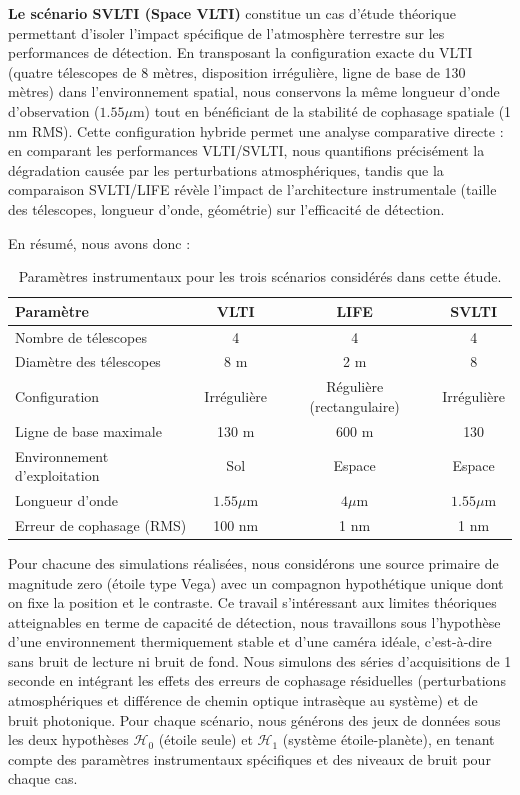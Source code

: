 \documentclass{article}
\begin{document}
\textbf{Le scénario SVLTI (Space VLTI)} constitue un cas d'étude théorique permettant d'isoler l'impact spécifique de l'atmosphère terrestre sur les performances de détection. En transposant la configuration exacte du VLTI (quatre télescopes de 8 mètres, disposition irrégulière, ligne de base de 130 mètres) dans l'environnement spatial, nous conservons la même longueur d'onde d'observation ($1.55\mu$m) tout en bénéficiant de la stabilité de cophasage spatiale (1 nm RMS). Cette configuration hybride permet une analyse comparative directe : en comparant les performances VLTI/SVLTI, nous quantifions précisément la dégradation causée par les perturbations atmosphériques, tandis que la comparaison SVLTI/LIFE révèle l'impact de l'architecture instrumentale (taille des télescopes, longueur d'onde, géométrie) sur l'efficacité de détection.

En résumé, nous avons donc :
\begin{table}[H]
\centering
\begin{tabular}{|l|c|c|c|}
\hline
\textbf{Paramètre} & \textbf{VLTI} & \textbf{LIFE} & \textbf{SVLTI} \\
\hline
Nombre de télescopes & 4 & 4 & 4 \\
Diamètre des télescopes & 8 m & 2 m & 8 \\
Configuration & Irrégulière & Régulière (rectangulaire) & Irrégulière \\
Ligne de base maximale & 130 m & 600 m & 130 \\
Environnement d'exploitation & Sol & Espace & Espace \\
Longueur d'onde & $1.55\mu$m & $4\mu$m & $1.55\mu$m \\
Erreur de cophasage (RMS) & 100 nm & 1 nm & 1 nm \\
\hline
\end{tabular}
\caption{Paramètres instrumentaux pour les trois scénarios considérés dans cette étude.}
\label{tab:scenarios}
\end{table}

Pour chacune des simulations réalisées, nous considérons une source primaire de magnitude zero (étoile type Vega) avec un compagnon hypothétique unique dont on fixe la position et le contraste. Ce travail s'intéressant aux limites théoriques atteignables en terme de capacité de détection, nous travaillons sous l'hypothèse d'une environnement thermiquement stable et d'une caméra idéale, c'est-à-dire sans bruit de lecture ni bruit de fond. Nous simulons des séries d'acquisitions de 1 seconde en intégrant les effets des erreurs de cophasage résiduelles (perturbations atmosphériques et différence de chemin optique intrasèque au système) et de bruit photonique. Pour chaque scénario, nous générons des jeux de données sous les deux hypothèses $\mathcal{H}_0$ (étoile seule) et $\mathcal{H}_1$ (système étoile-planète), en tenant compte des paramètres instrumentaux spécifiques et des niveaux de bruit pour chaque cas.
\end{document}
